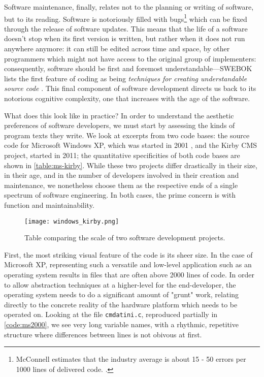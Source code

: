 Software maintenance, finally, relates not to the planning or writing of software, but to its reading. Software is notoriously filled with bugs\footnote{McConnell estimates that the industry average is about 15 - 50 errors per 1000 lines of delivered code. \citep{mcconnell_code_2004}.} which can be fixed through the release of software updates. This means that the life of a software doesn't stop when its first version is written, but rather when it does not run anywhere anymore: it can still be edited across time and space, by other programmers which might not have access to the original group of implementers: consequently, software should be first and foremost understandable—SWEBOK lists the first feature of coding as being \emph{techniques for creating understandable source code} \citep{bourque_swebok_2014}. This final component of software development directs us back to its notorious cognitive complexity, one that increases with the age of the software.

What does this look like in practice? In order to understand the aesthetic preferences of software developers, we must start by assessing the kinds of program texts they write. We look at excerpts from two code bases: the source code for Microsoft Windows XP, which was started in 2001 \citep{warren_windows_2020}, and the Kirby CMS project, started in 2011; the quantitative specificities of both code bases are shown in \autoref{table:ms-kirby}. While these two projects differ drastically in their size, in their age, and in the number of developers involved in their creation and maintenance, we nonetheless choose them as the respective ends of a single spectrum of software engineering. In both cases, the prime concern is with function and maintainability.

\begin{figure}
  \texttt{[image: windows\_kirby.png]}
  \caption{Table comparing the scale of two software development projects.}
  \label{table:ms-kirby}
\end{figure}

First, the most striking visual feature of the code is its sheer size. In the case of Microsoft XP, representing such a versatile and low-level application such as an operating system results in files that are often above 2000 lines of code. In order to allow abstraction techniques at a higher-level for the end-developer, the operating system needs to do a significant amount of "grunt" work, relating directly to the concrete reality of the hardware platform which needs to be operated on. Looking at the file \lstinline{cmdatini.c}, reproduced partially in \autoref{code:ms2000}, we see very long variable names, with a rhythmic, repetitive structure where differences between lines is not obivous at first.

